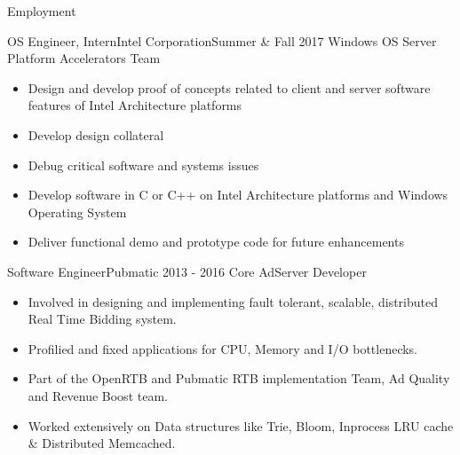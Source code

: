\documentclass[]{mcdowellcv}
\begin{document}
	\makeheader
	
	\begin{cvsection}{Employment}
		\begin{cvsubsection}{OS Engineer, Intern}{Intel Corporation}{Summer \& Fall 2017}
			Windows OS Server Platform Accelerators Team			
			\begin{itemize}
			\item Design and develop proof of concepts related to client and server software features of Intel Architecture platforms 
			\item Develop design collateral 
			\item Debug critical software and systems issues 
			\item Develop software in C or C++ on Intel Architecture platforms and Windows Operating System 
			\item Deliver functional demo and prototype code for future enhancements 			
		\end{itemize}
		\end{cvsubsection}
		
		\begin{cvsubsection}{Software Engineer}{Pubmatic }{2013 - 2016}	
			Core AdServer Developer
			\begin{itemize}
			\item Involved in designing and implementing fault tolerant, scalable, distributed Real Time Bidding system.
			\item  Profilied and fixed applications for CPU, Memory and I/O bottlenecks.
			\item Part of the OpenRTB and Pubmatic RTB implementation Team, Ad Quality and Revenue Boost team.
			\item Worked extensively on Data structures like Trie, Bloom, Inprocess LRU cache \& Distributed Memcached.
			\end{itemize}
		\end{cvsubsection}
		
		\end{cvsection}
	
\end{document}
